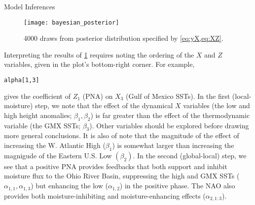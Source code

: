 \begin{block}{Model Inferences}
    \begin{figure}
        \centering
        \texttt{[image: bayesian\_posterior]}
        \caption{\num{4000} draws from posterior distribution specified by \cref{eq:yX,eq:XZ}.}
        \label{fig:posterior}
    \end{figure}
    Interpreting the results of \cref{fig:posterior} requires noting the ordering of the $X$ and $Z$ variables, given in the plot's bottom-right corner.
    For example, \begin{verbatim}alpha[1,3]\end{verbatim} gives the coefficient of $Z_{1}$ (PNA) on $X_3$ (Gulf of Mexico SSTs).
    In the first (local-moisture) step, we note that the effect of the dynamical $X$ variables (the low and high height anomalies; $\beta_1, \beta_2$) is far greater than the effect of the thermodynamic variable (the GMX SSTs; $\beta_3$).
    Other variables should be explored before drawing more general conclusions.
    It is also of note that the magnitude of the effect of increasing the W. Atlantic High ($\beta_1$) is somewhat larger than increasing the magnigude of the Eastern U.S. Low $(\beta_2)$.
    In the second (global-local) step, we see that a positive PNA provides feedbacks that both support and inhibit moisture flux to the Ohio River Basin, suppressing the high and GMX SSTs ($\alpha_{1,1}, \alpha_{1,3}$) but enhancing the low ($\alpha_{1,2}$) in the positive phase.
    The NAO also provides both moisture-inhibiting and moisture-enhancing effects ($\alpha_{2,1:3}$).
\end{block}

